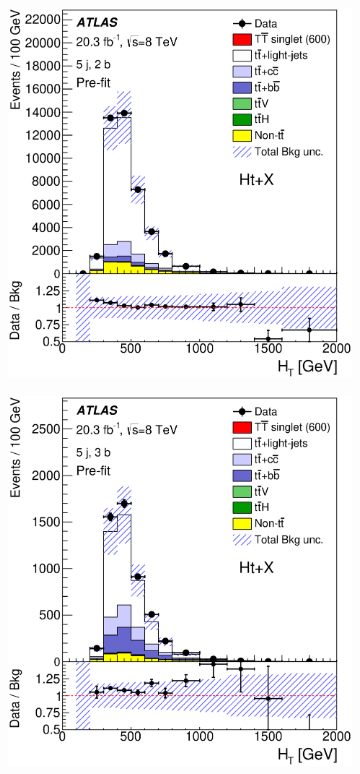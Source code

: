 \begin{figure}[!tp]
\begin{center}
  \begin{subfigure}{0.49\textwidth}
\includegraphics[width=\textwidth]{Analysis/Figures_HtX/HtXPaper/HtX/prefit_unblind/HTAll_5jetex2btagex8TeV.eps}
\caption{}\end{subfigure}
  \begin{subfigure}{0.49\textwidth}
\includegraphics[width=\textwidth]{Analysis/Figures_HtX/HtXPaper/HtX/prefit_unblind/HTAll_5jetex3btagex8TeV.eps}

\end{subfigure}
\end{center}
\end{figure}
